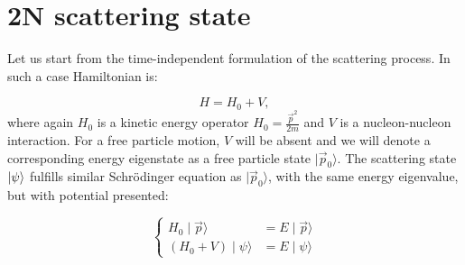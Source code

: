 \section{2N scattering state}





    Let us start from the time-independent formulation of the scattering process.
    In such a case Hamiltonian is:

    \begin{equation}
        H = H_0 + V,
    \end{equation}
    where again $H_0$ is a kinetic energy operator $H_0 = \frac{\vec{p}^2}{2m}$ 
    and $V$ is a nucleon-nucleon interaction.
    For a free particle motion, $V$ will be absent and we will denote a corresponding energy eigenstate as
    a free particle state $\mid \vec{p}_0 \rangle$.
    The scattering state $\ket{\psi}$ fulfills similar Schr\"{o}dinger equation as 
    $\mid \vec{p}_0 \rangle$, with the same energy eigenvalue, but with potential presented:
    


    \begin{equation}
        \begin{cases}
            H_0 \mid \vec{p} \rangle &= E \mid \vec{p} \rangle \\
            (H_0 + V) \mid \psi \rangle &= E \mid \psi \rangle
        \end{cases}
        \label{system}
    \end{equation}

